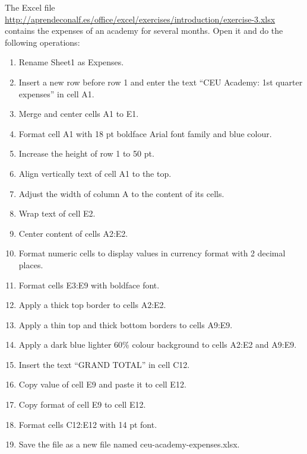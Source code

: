 \begin{enumerate}[leftmargin=*]
\ite The Excel file \url{http://aprendeconalf.es/office/excel/exercises/introduction/exercise-3.xlsx} contains the expenses of an
academy for several months. 
Open it and do the following operations:
\begin{enumerate}
\item Rename \textsf{Sheet1} as \textsf{Expenses}.
\item Insert a new row before row 1 and enter the text ``CEU Academy: 1st quarter expenses'' in cell A1.
\item Merge and center cells A1 to E1.
\item Format cell A1 with 18 pt boldface Arial font family and blue colour.
\item Increase the height of row 1 to 50 pt.
\item Align vertically text of cell A1 to the top.
\item Adjust the width of column A to the content of its cells.
\item Wrap text of cell E2.
\item Center content of cells A2:E2.
\item Format numeric cells to display values in currency format with 2 decimal places.
\item Format cells E3:E9 with boldface font.
\item Apply a thick top border to cells A2:E2.
\item Apply a thin top and thick bottom borders to cells A9:E9.
\item Apply a dark blue lighter 60\% colour background to cells A2:E2 and A9:E9.
\item Insert the text ``GRAND TOTAL'' in cell C12.
\item Copy value of cell E9 and paste it to cell E12.
\item Copy format of cell E9 to cell E12. 
\item Format cells C12:E12 with 14 pt font.
\item Save the file as a new file named \textsf{ceu-academy-expenses.xlsx}.
\end{enumerate}


\end{enumerate}